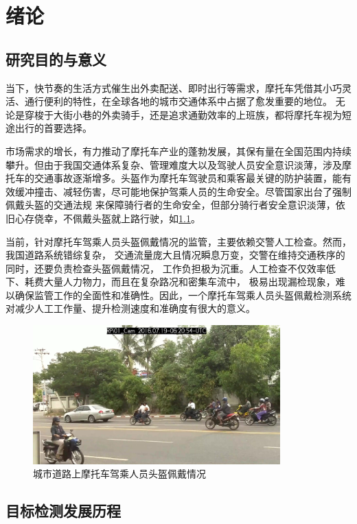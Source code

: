 \chapter{绪论}

\section{研究目的与意义}

当下，快节奏的生活方式催生出外卖配送、即时出行等需求，摩托车凭借其小巧灵活、通行便利的特性，在全球各地的城市交通体系中占据了愈发重要的地位。
无论是穿梭于大街小巷的外卖骑手，还是追求通勤效率的上班族，都将摩托车视为短途出行的首要选择。

市场需求的增长，有力推动了摩托车产业的蓬勃发展，其保有量在全国范围内持续攀升。但由于我国交通体系复杂、管理难度大以及驾驶人员安全意识淡薄，涉及摩托车的交通事故逐渐增多。头盔作为摩托车驾驶员和乘客最关键的防护装置，能有效缓冲撞击、减轻伤害，尽可能地保护驾乘人员的生命安全\cite{hss}。尽管国家出台了强制佩戴头盔的交通法规
来保障骑行者的生命安全，但部分骑行者安全意识淡薄，依旧心存侥幸，不佩戴头盔就上路行驶，如\ref{fig:traffic}。

当前，针对摩托车驾乘人员头盔佩戴情况的监管，主要依赖交警人工检查。然而，我国道路系统错综复杂，
交通流量庞大且情况瞬息万变，交警在维持交通秩序的同时，还要负责检查头盔佩戴情况，
工作负担极为沉重。人工检查不仅效率低下、耗费大量人力物力，而且在复杂路况和密集车流中，
极易出现漏检现象，难以确保监管工作的全面性和准确性。因此，一个摩托车驾乘人员头盔佩戴检测系统对减少人工工作量、提升检测速度和准确度有很大的意义。

\begin{figure}[!htb]
  \centering
  \includegraphics[width=0.85\textwidth]{figs/chap01/traffic}
  \caption{城市道路上摩托车驾乘人员头盔佩戴情况}
  \label{fig:traffic}
\end{figure}
\section{目标检测发展历程}

